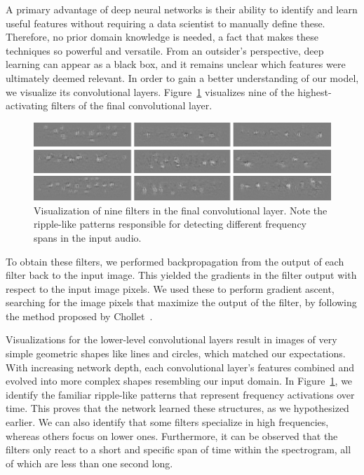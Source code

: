 A primary advantage of deep neural networks is their ability to identify and learn useful features without requiring a data scientist to manually define these. Therefore, no prior domain knowledge is needed, a fact that makes these techniques so powerful and versatile. From an outsider's perspective, deep learning can appear as a black box, and it remains unclear which features were ultimately deemed relevant. In order to gain a better understanding of our model, we visualize its convolutional layers. Figure~\ref{fig:conv_filter} visualizes nine of the highest-activating filters of the final convolutional layer.
%
	\begin{figure}[tp]
  		\centering
    	\includegraphics{img/conv_filter.pdf}
    	\caption{Visualization of nine filters in the final convolutional layer. Note the ripple-like patterns responsible for detecting different frequency spans in the input audio.}
    	\label{fig:conv_filter}
	\end{figure}
%
To obtain these filters, we performed backpropagation from the output of each filter back to the input image. This yielded the gradients in the filter output with respect to the input image pixels. We used these to perform gradient ascent, searching for the image pixels that maximize the output of the filter, by following the method proposed by Chollet~\cite{chol16}.

Visualizations for the lower-level convolutional layers result in images of very simple geometric shapes like lines and circles, which matched our expectations. With increasing network depth, each convolutional layer's features combined and evolved into more complex shapes resembling our input domain. In Figure~\ref{fig:conv_filter}, we identify the familiar ripple-like patterns that represent frequency activations over time. This proves that the network learned these structures, as we hypothesized earlier. We can also identify that some filters specialize in high frequencies, whereas others focus on lower ones. Furthermore, it can be observed that the filters only react to a short and specific span of time within the spectrogram, all of which are less than one second long.

